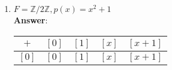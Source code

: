 \documentclass{article}
\begin{document}
\begin{enumerate}
\begin{enumerate}
\begin{adjustwidth}{-1in}{-1in}
\begin{center}
\begin{tabular}{c|c c c c c c c c c}
                                          \hline
                                          $[0]$    & $[0]$ & $[0]$    & $[0]$    & $[0]$    & $[0]$    & $[0]$    & $[0]$    & $[0]$    & $[0]$    \\
                                          $[1]$    & $[0]$ & $[1]$    & $[2]$    & $[x]$    & $[x+1]$  & $[x+2]$  & $[2x]$   & $[2x+1]$ & $[2x+2]$ \\
                                          $[2]$    & $[0]$ & $[2]$    & $[1]$    & $[2x]$   & $[2x+2]$ & $[2x+1]$ & $[x]$    & $[x+2]$  & $[x+1]$  \\
                                          $[x]$    & $[0]$ & $[x]$    & $[2x]$   & $[2]$    & $[x+2]$  & $[2x+2]$ & $[1]$    & $[x+1]$  & $[2x+1]$ \\
                                          $[x+1]$  & $[0]$ & $[x+1]$  & $[2x+2]$ & $[x+2]$  & $[2x]$   & $[1]$    & $[2x+1]$ & $[2]$    & $[x]$    \\
                                          $[x+2]$  & $[0]$ & $[x+2]$  & $[2x+1]$ & $[2x+2]$ & $[1]$    & $[x]$    & $[x+1]$  & $[2x]$   & $[2]$    \\
                                          $[2x]$   & $[0]$ & $[2x]$   & $[x]$    & $[1]$    & $[2x+1]$ & $[x+1]$  & $[2]$    & $[2x+2]$ & $[x+2]$  \\
                                          $[2x+1]$ & $[0]$ & $[2x+1]$ & $[x+2]$  & $[x+1]$  & $[2]$    & $[2x]$   & $[2x+2]$ & $[x]$    & $[1]$    \\
                                          $[2x+2]$ & $[0]$ & $[2x+2]$ & $[x+1]$  & $[2x+1]$ & $[x]$    & $[2]$    & $[x+2]$  & $[1]$    & $[2x]$
                                    \end{tabular}
                              \end{center}
                        \end{adjustwidth}
                  \item $F=\mathbb{Z}/2\mathbb{Z},p(x)=x^2+1$\\
                        \textbf{Answer}:
                        \begin{center}
                              \begin{tabular}{c|c c c c}
                                    $+$     & $[0]$   & $[1]$   & $[x]$   & $[x+1]$ \\
                                    \hline
                                    $[0]$   & $[0]$   & $[1]$   & $[x]$   & $[x+1]$ \\

\end{tabular}
\end{center}
\end{enumerate}
\end{enumerate}
\end{document}
